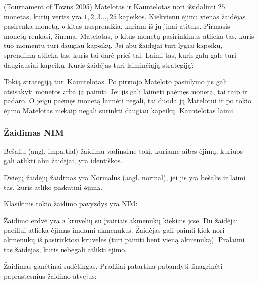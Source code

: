 \begin{pavnr}{(Tournament of Towns 2005)}
  Matelotas ir Kauntelotas nori išsidalinti $25$ monetas, kurių vertės yra $1, 2, 3 \dots
  , 25$ kapeikos. Kiekvienu ėjimu vienas žaidėjas pasirenka monetą, o kitas
  nusprendžia, kuriam iš jų jinai atiteks. Pirmasis monetą renkasi, žinoma,
  Matelotas, o kitus monetų pasirinkimus atlieka tas, kuris tuo momentu turi
  daugiau kapeikų. Jei abu žaidėjai turi lygiai kapeikų, sprendimą atlieka
  tas, kuris tai darė prieš tai. Laimi tas, kuris galų gale turi
  daugiausiai kapeikų.  Kuris žaidėjas turi laiminčiąją strategiją?
\end{pavnr}

Tokią strategiją turi Kauntelotas. Po pirmojo Mateloto pasiūlymo jis gali atsisakyti
monetos arba ją paimti. Jei jis gali laimėti paėmęs monetą, tai taip ir
padaro. O jeigu paėmęs monetą laimėti negali, tai duoda ją Matelotui ir po
tokio ėjimo Matelotas niekaip negali surinkti daugiau kapeikų. Kauntelotas laimi.

\subsubsection{Žaidimas NIM}

\begin{api}
  Bešaliu (angl. impartial) žaidimu vadinsime tokį, kuriame aibės ėjimų, kuriuos
  gali atlikti abu žaidėjai, yra identiškos.
\end{api}

\begin{api}
  Dviejų žaidėjų žaidimas yra Normalus (angl. normal), jei jis yra bešalis ir laimi
  tas, kuris atliko paskutinį ėjimą.
\end{api}

Klasikinis tokio žaidimo pavyzdys yra NIM:

\begin{api}
  Žaidimo erdvė yra $n$ krūvelių su įvairiais akmenukų kiekiais jose. Du
  žaidėjai paeiliui atlieka ėjimus imdami akmenukus. Žaidėjas gali paimti
  kiek nori akmenukų iš pasirinktosi krūvelės (turi paimti bent vieną
  akmenuką). Pralaimi tas žaidėjas, kuris nebegali atlikti ėjimo.
\end{api}

Žaidimas ganėtinai sudėtingas. Pradžiai patartina pabandyti išnagrinėti
paprastesnius žaidimo atvejus:

